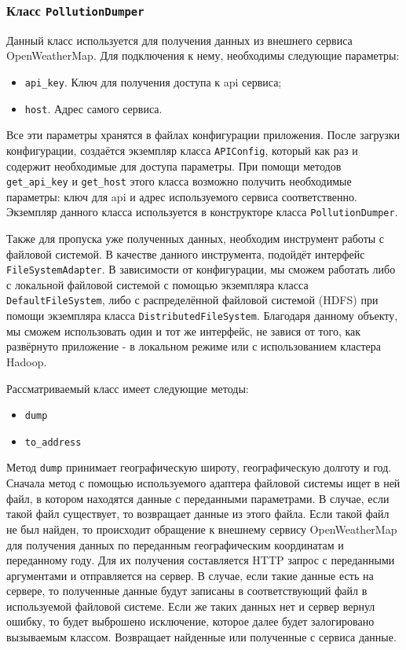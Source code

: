 \subsubsection{Класс \texttt{PollutionDumper}}
Данный класс используется для получения данных из внешнего сервиса OpenWeatherMap.
Для подключения к нему, необходимы следующие параметры:

\begin{itemize}
\item \texttt{api\_key}. Ключ для получения доступа к api сервиса;
\item \texttt{host}. Адрес самого сервиса.
\end{itemize}

Все эти параметры хранятся в файлах конфигурации приложения.
После загрузки конфигурации, создаётся экземпляр класса \texttt{APIConfig}, который как раз и содержит необходимые для доступа параметры.
При помощи методов \texttt{get\_api\_key} и \texttt{get\_host} этого класса возможно получить необходимые параметры: ключ для api и адрес используемого сервиса соответственно.
Экземпляр данного класса используется в конструкторе класса \texttt{PollutionDumper}.

Также для пропуска уже полученных данных, необходим инструмент работы с файловой системой.
В качестве данного инструмента, подойдёт интерфейс \texttt{FileSystemAdapter}.
В зависимости от конфигурации, мы сможем работать либо с локальной файловой системой с помощью экземпляра класса \texttt{DefaultFileSystem}, либо с распределённой файловой системой (HDFS) при помощи экземпляра класса \texttt{DistributedFileSystem}.
Благодаря данному объекту, мы сможем использовать один и тот же интерфейс, не завися от того, как развёрнуто приложение - в локальном режиме или с использованием кластера Hadoop.

Рассматриваемый класс имеет следующие методы:
\begin{itemize}
\item \texttt{dump}
\item \texttt{to\_address}
\end{itemize}

Метод \texttt{dump} принимает географическую широту, географическую долготу и год.
Сначала метод с помощью используемого адаптера файловой системы ищет в ней файл, в котором находятся данные с переданными параметрами.
В случае, если такой файл существует, то возвращает данные из этого файла.
Если такой файл не был найден, то происходит обращение к внешнему сервису OpenWeatherMap для получения данных по переданным географическим координатам и переданному году.
Для их получения составляется HTTP запрос с переданными аргументами и отправляется на сервер.
В случае, если такие данные есть на сервере, то полученные данные будут записаны в соответствующий файл в используемой файловой системе.
Если же таких данных нет и сервер вернул ошибку, то будет выброшено исключение, которое далее будет залогировано вызываемым классом.
Возвращает найденные или полученные с сервиса данные.

